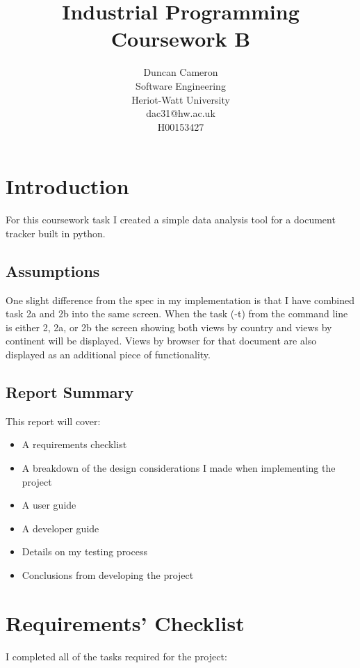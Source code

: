 \documentclass[11pt]{report}
\begin{document}
\title{Industrial Programming Coursework B}
\author{Duncan Cameron \\
Software Engineering \\
Heriot-Watt University \\
dac31@hw.ac.uk\\
H00153427}
\maketitle

\newpage
\tableofcontents
{}

\chapter{Introduction}
For this coursework task I created a simple data analysis tool for a document tracker built in python.
\section{Assumptions}
One slight difference from the spec in my implementation is that I have combined task 2a and 2b into the same screen.  When the task (-t) from the command line is either 2, 2a, or 2b the screen showing both views by country and views by continent will be displayed.  Views by browser for that document are also displayed as an additional piece of functionality.

\section{Report Summary}
This report will cover:
\begin{itemize}
\item{A requirements checklist}
\item{A breakdown of the design considerations I made when implementing the project}
\item{A user guide}
\item{A developer guide}
\item{Details on my testing process}
\item{Conclusions from developing the project}
\end{itemize} 



\chapter{Requirements' Checklist}
I completed all of the tasks required for the project:
\end{document}
